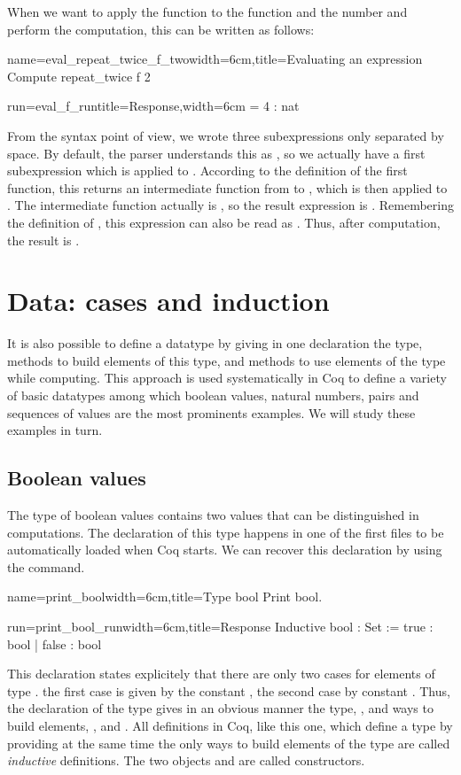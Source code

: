 When we want to apply the function  to the function
 and the number  and perform the computation, this can be
written as follows:
\begin{coq}{name=eval_repeat_twice_f_two}{width=6cm,title=Evaluating
    an expression}
Compute repeat_twice f 2
\end{coq}
\begin{coqout}{run=eval_f_run}{title=Response,width=6cm}
  = 4 : nat
\end{coqout}
From the syntax point of view, we wrote three subexpressions only
separated by space.  By default, the parser understands this as
, so we actually have a first subexpression
which is  applied to .  According to the
definition of the first function, this returns an intermediate
function from 
to , which is then applied to .  The intermediate function
actually is , so the result expression is .  Remembering the definition of , this expression can also
be read as .  Thus, after computation, the result is .

\section{Data: cases and induction}
It is also possible to define a datatype by giving in one declaration
the type, methods to build elements of this type, and methods to
use elements of the type while computing.  This approach is used
systematically in Coq to define a variety of basic datatypes among
which boolean values, natural numbers, pairs and sequences of values
are the most prominents examples.  We will study these examples in
turn.
\subsection{Boolean values}
The type  of boolean values contains two values that can be
distinguished in computations.  The declaration of this type happens
in one of the first files to be automatically loaded when Coq starts.
We can recover this declaration by using the  command.

\begin{coq}{name=print_bool}{width=6cm,title=Type bool}
Print bool.
\end{coq}
\begin{coqout}{run=print_bool_run}{width=6cm,title=Response}
Inductive bool : Set := true : bool | false : bool
\end{coqout}
This declaration states explicitely that there are only two cases for
elements of type .  the first case is given by the constant
, the second case by constant .  Thus, the
declaration of the type gives in an obvious manner the type, ,
and ways to build elements, , and .  All definitions
in Coq, like this one, which define a type by providing at the same
time the only ways to build elements of the type are called {\em
  inductive} definitions.  The two objects  and  are
called constructors.

